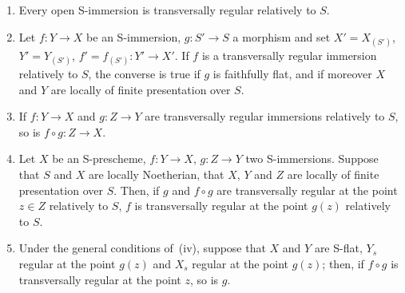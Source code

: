 \begin{proposition}[19.2.7]
\label{IV.19.2.7}
\medskip\noindent
\begin{enumerate}[label=(\roman*)]
  \item Every open S-immersion is transversally regular relatively to $S$.
  \item Let $f:Y\to X$ be an S-immersion, $g:S'\to S$ a morphism and set $X'=X_{(S')}$, $Y'=Y_{(S')}$, $f'=f_{(S')}:Y'\to X'$.
If $f$ is a transversally regular immersion relatively to $S$, the converse is true if $g$ is faithfully flat, and if moreover $X$ and $Y$ are locally of finite presentation over $S$.
  \item If $f:Y\to X$ and $g:Z\to Y$ are transversally regular immersions relatively to $S$, so is $f\circ g:Z\to X$.
  \item Let $X$ be an S-prescheme, $f:Y\to X$, $g:Z\to Y$ two S-immersions.
Suppose that $S$ and $X$ are locally Noetherian, that $X$, $Y$ and $Z$ are locally of finite presentation over $S$.
Then, if $g$ and $f\circ g$ are transversally regular at the point $z\in Z$ relatively to $S$, $f$ is transversally regular at the point $g(z)$ relatively to $S$.
  \item Under the general conditions of~(iv), suppose that $X$ and $Y$ are S-flat, $Y_s$ regular at the point $g(z)$ and $X_s$ regular at the point $g(z)$; then, if $f\circ g$ is transversally regular at the point $z$, so is $g$.
\end{enumerate}
\end{proposition}

